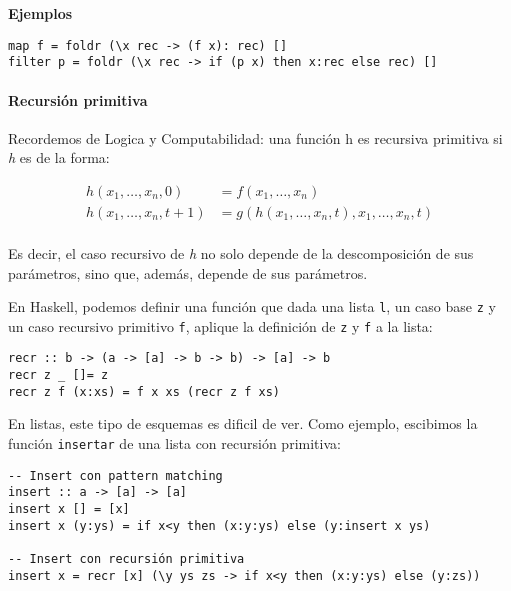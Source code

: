 \documentclass[10pt,a4paper]{article}
\begin{document}
\textbf{Ejemplos}

\begin{centrado}
	\begin{verbatim}
map f = foldr (\x rec -> (f x): rec) []
filter p = foldr (\x rec -> if (p x) then x:rec else rec) []
	\end{verbatim}
\end{centrado}


\paragraph{Recursión primitiva}
Recordemos de Logica y Computabilidad: una función h es recursiva primitiva si \textit{h} es de la forma:

\begin{align}
		h(x_1,\dots,x_n,0) &= f(x_1,\dots,x_n) \\
		h(x_1,\dots,x_n,t+1) &= g(h(x_1,\dots,x_n, t),x_1,\dots, x_n, t) \\
\end{align}

Es decir, el caso recursivo de \textit{h} no solo depende de la descomposición de sus parámetros, sino que, además, depende de sus parámetros.

En Haskell, podemos definir una función que dada una lista \texttt{l}, un caso base \texttt{z} y un caso recursivo primitivo \texttt{f}, aplique la definición de \texttt{z} y \texttt{f} a la lista:
\begin{centrado}
	\begin{verbatim}
recr :: b -> (a -> [a] -> b -> b) -> [a] -> b
recr z _ []= z
recr z f (x:xs) = f x xs (recr z f xs)
	\end{verbatim}
\end{centrado}

En listas, este tipo de esquemas es dificil de ver. Como ejemplo, escibimos la función \texttt{insertar} de una lista con recursión primitiva:
\begin{centrado}
	\begin{verbatim}
-- Insert con pattern matching
insert :: a -> [a] -> [a]
insert x [] = [x]
insert x (y:ys) = if x<y then (x:y:ys) else (y:insert x ys)

-- Insert con recursión primitiva
insert x = recr [x] (\y ys zs -> if x<y then (x:y:ys) else (y:zs))
	\end{verbatim}
\end{centrado}
\end{document}

